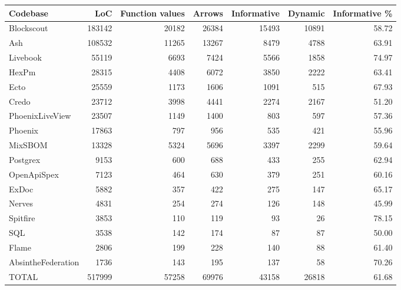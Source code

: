 \begin{tabular}{lrrrrrr}
\toprule
Codebase & LoC & Function values & Arrows & Informative & Dynamic & Informative \% \\
\midrule
Blockscout & 183142 & 20182 & 26384 & 15493 & 10891 & 58.72 \\
Ash & 108532 & 11265 & 13267 & 8479 & 4788 & 63.91 \\
Livebook & 55119 & 6693 & 7424 & 5566 & 1858 & 74.97 \\
HexPm & 28315 & 4408 & 6072 & 3850 & 2222 & 63.41 \\
Ecto & 25559 & 1173 & 1606 & 1091 & 515 & 67.93 \\
Credo & 23712 & 3998 & 4441 & 2274 & 2167 & 51.20 \\
PhoenixLiveView & 23507 & 1149 & 1400 & 803 & 597 & 57.36 \\
Phoenix & 17863 & 797 & 956 & 535 & 421 & 55.96 \\
MixSBOM & 13328 & 5324 & 5696 & 3397 & 2299 & 59.64 \\
Postgrex & 9153 & 600 & 688 & 433 & 255 & 62.94 \\
OpenApiSpex & 7123 & 464 & 630 & 379 & 251 & 60.16 \\
ExDoc & 5882 & 357 & 422 & 275 & 147 & 65.17 \\
Nerves & 4831 & 254 & 274 & 126 & 148 & 45.99 \\
Spitfire & 3853 & 110 & 119 & 93 & 26 & 78.15 \\
SQL & 3538 & 142 & 174 & 87 & 87 & 50.00 \\
Flame & 2806 & 199 & 228 & 140 & 88 & 61.40 \\
AbsintheFederation & 1736 & 143 & 195 & 137 & 58 & 70.26 \\
\midrule
TOTAL & 517999 & 57258 & 69976 & 43158 & 26818 & 61.68 \\
\bottomrule
\end{tabular}
